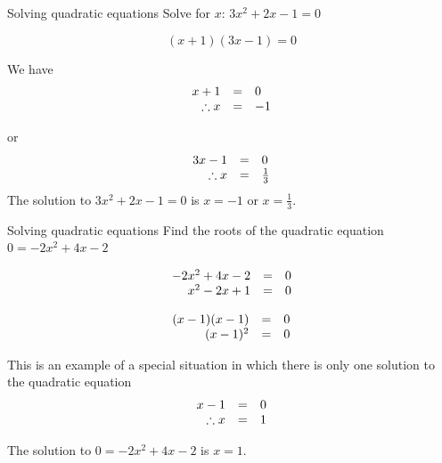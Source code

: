         
\begin{wex}
{Solving quadratic equations }
{Solve for $x$: $3{x}^{2}+2x-1=0$}
{

\begin{equation*}
(x+1)(3x-1)=0
\end{equation*}

We have
\begin{equation*}
     \begin{array}{ccc}\hfill x+1&=&0\hfill \\
	\hfill \therefore x&=&-1
    \end{array}
\end{equation*}

or
\begin{equation*}
     \begin{array}{ccc}\hfill 3x-1&=&0\hfill \\
	\hfill \therefore x&=&\frac{1}{3}
    \end{array}
\end{equation*}
The solution to $3{x}^{2}+2x-1=0$ is $x=-1$ or $x=\frac{1}{3}$.
}
\end{wex}


\begin{wex}{ Solving quadratic equations }
{Find the roots of the quadratic equation  $0=-2{x}^{2}+4x-2$}
{

\begin{equation*}
\begin{array}{ccc}\hfill -2{x}^{2}+4x-2& =& 0\hfill \\ \hfill {x}^{2}-2x+1& =& 0\hfill \end{array}
\end{equation*}


\begin{equation*}
\begin{array}{ccc} \hfill (x-1)(x-1) &=& 0 \hfill \\
\hfill (x-1)^{2} &=&0 \hfill 
\end{array}
\end{equation*}

This is an example of a special situation in which there is only one solution to the quadratic equation
\begin{equation*}
\begin{array}{ccc} \hfill x -1 &=& 0 \hfill \\
\hfill \therefore x &=&1 \hfill 
\end{array}
\end{equation*}


 
The solution to $0=-2{x}^{2}+4x-2$ is $x=1$.
}
\end{wex}



